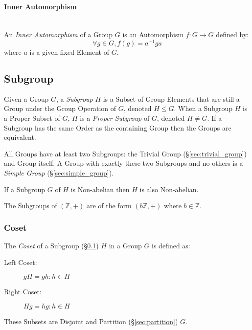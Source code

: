 \paragraph{Inner Automorphism}\label{sec:inner_automorphism}
\hfill \\

An \emph{Inner Automorphism} of a Group $G$ is an Automorphism $f : G
\rightarrow G$ defined by:
\[
    \forall g \in G, f(g) = a^{-1}ga
\]
where $a$ is a given fixed Element of $G$.



\subsection{Subgroup}\label{sec:subgroup}

Given a Group $G$, a \emph{Subgroup} $H$ is a Subset of Group Elements
that are still a Group under the Group Operation of $G$, denoted $H
\leq G$. When a Subgroup $H$ is a Proper Subset of $G$, $H$ is a
\emph{Proper Subgroup} of $G$, denoted $H \neq G$. If a Subgroup has
the same Order as the containing Group then the Groups are equivalent.

All Groups have at least two Subgroups: the Trivial Group
(\S\ref{sec:trivial_group}) and Group itself. A Group with exactly
these two Subgroups and no others is a \emph{Simple Group}
(\S\ref{sec:simple_group}).

If a Subgroup $G$ of $H$ is Non-abelian then $H$ is also Non-abelian.

The Subgroups of $(\mathbb{Z},+)$ are of the form $(b\mathbb{Z},+)$
where $b \in \mathbb{Z}$.



\subsubsection{Coset}\label{sec:coset}

The \emph{Coset} of a Subgroup (\S\ref{sec:subgroup}) $H$ in a Group
$G$ is defined as:
\begin{description}
\item[Left Coset:] $gH = {gh : h \in H}$
\item[Right Coset:] $Hg = {hg : h \in H}$
\end{description}
These Subsets are Disjoint and Partition (\S\ref{sec:partition}) $G$.

